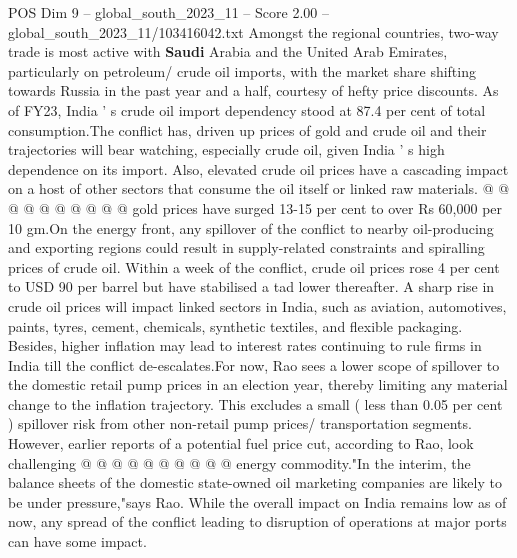 \begin{textsample}{POS Dim 9 – global\_south\_2023\_11 – Score 2.00 – global\_south\_2023\_11/103416042.txt}
Amongst the regional countries, two-way trade is most active with \textbf{Saudi} Arabia and the United Arab Emirates, particularly on petroleum/ crude oil imports, with the market share shifting towards Russia in the past year and a half, courtesy of hefty price discounts.
As of FY23, India ' s crude oil import dependency stood at 87.4 per cent of total consumption.The conflict has, driven up prices of gold and crude oil and their trajectories will bear watching, especially crude oil, given India ' s high dependence on its import.
Also, elevated crude oil prices have a cascading impact on a host of other sectors that consume the oil itself or linked raw materials. @ @ @ @ @ @ @ @ @ @ gold prices have surged 13-15 per cent to over Rs 60,000 per 10 gm.On the energy front, any spillover of the conflict to nearby oil-producing and exporting regions could result in supply-related constraints and spiralling prices of crude oil.
Within a week of the conflict, crude oil prices rose 4 per cent to USD 90 per barrel but have stabilised a tad lower thereafter.
A sharp rise in crude oil prices will impact linked sectors in India, such as aviation, automotives, paints, tyres, cement, chemicals, synthetic textiles, and flexible packaging.
Besides, higher inflation may lead to interest rates continuing to rule firms in India till the conflict de-escalates.For now, Rao sees a lower scope of spillover to the domestic retail pump prices in an election year, thereby limiting any material change to the inflation trajectory.
This excludes a small ( less than 0.05 per cent ) spillover risk from other non-retail pump prices/ transportation segments.
However, earlier reports of a potential fuel price cut, according to Rao, look challenging @ @ @ @ @ @ @ @ @ @ energy commodity."In the interim, the balance sheets of the domestic state-owned oil marketing companies are likely to be under pressure,"says Rao.
While the overall impact on India remains low as of now, any spread of the conflict leading to disruption of operations at major ports can have some impact.

\end{textsample}
